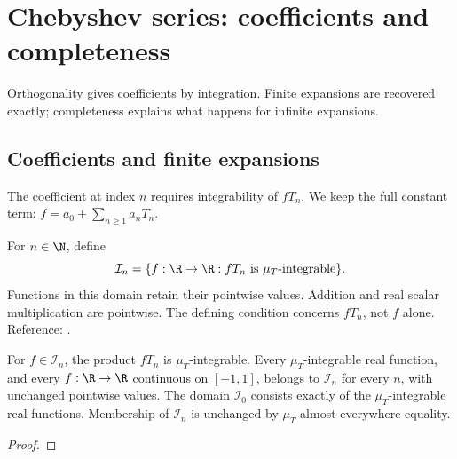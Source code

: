 \chapter{Chebyshev series: coefficients and completeness}\label{chap:coefficients}


Orthogonality gives coefficients by integration. Finite expansions are recovered exactly; completeness explains what happens for infinite expansions.

\section{Coefficients and finite expansions}\label{sec:textbook-coefficients-coefficients}

The coefficient at index $n$ requires integrability of $fT_n$. We keep the full constant term: $f=a_0+\sum_{n\ge1}a_nT_n$.

\begin{definition}
\label{def:coefficient-input}
\leanok
For $n\in\N$, define
\[
\mathcal I_n=\{f:\R\to\R: fT_n\text{ is }\mu_T\text{-integrable}\}.
\]
Functions in this domain retain their pointwise values. Addition and real
scalar multiplication are pointwise. The defining condition concerns $fT_n$,
not $f$ alone.
Reference: \cite[Chapter 3]{atap}.
\end{definition}

\begin{theorem}
\label{thm:coefficient-input}
\leanok
For $f\in\mathcal I_n$, the product $fT_n$ is $\mu_T$-integrable.
Every $\mu_T$-integrable real function, and every $f:\R\to\R$ continuous on
$[-1,1]$, belongs to $\mathcal I_n$ for every $n$, with unchanged pointwise values.
The domain $\mathcal I_0$ consists exactly of the $\mu_T$-integrable real functions.
Membership of $\mathcal I_n$ is unchanged by $\mu_T$-almost-everywhere equality.
\end{theorem}
\begin{proof}
\leanok
\end{proof}

